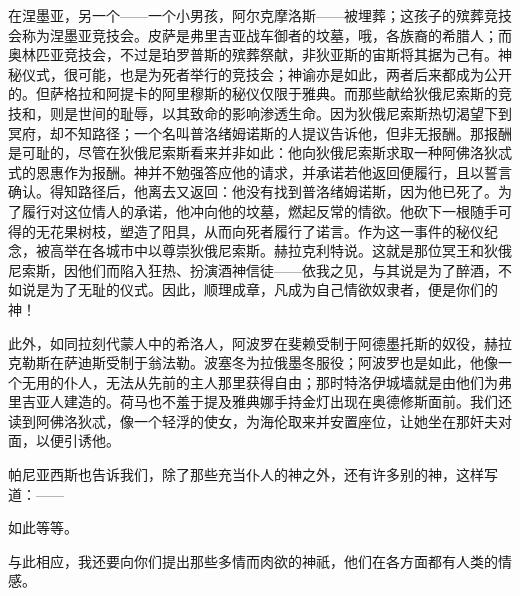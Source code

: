 在涅墨亚，另一个——一个小男孩，阿尔克摩洛斯——被埋葬；这孩子的殡葬竞技会称为涅墨亚竞技会。皮萨是弗里吉亚战车御者的坟墓，哦，各族裔的希腊人；而奥林匹亚竞技会，不过是珀罗普斯的殡葬祭献，非狄亚斯的宙斯将其据为己有。神秘仪式，很可能，也是为死者举行的竞技会；神谕亦是如此，两者后来都成为公开的。但萨格拉和阿提卡的阿里穆斯的秘仪仅限于雅典。而那些献给狄俄尼索斯的竞技和，则是世间的耻辱，以其致命的影响渗透生命。因为狄俄尼索斯热切渴望下到冥府，却不知路径；一个名叫普洛绪姆诺斯的人提议告诉他，但非无报酬。那报酬是可耻的，尽管在狄俄尼索斯看来并非如此：他向狄俄尼索斯求取一种阿佛洛狄忒式的恩惠作为报酬。神并不勉强答应他的请求，并承诺若他返回便履行，且以誓言确认。得知路径后，他离去又返回：他没有找到普洛绪姆诺斯，因为他已死了。为了履行对这位情人的承诺，他冲向他的坟墓，燃起反常的情欲。他砍下一根随手可得的无花果树枝，塑造了阳具，从而向死者履行了诺言。作为这一事件的秘仪纪念，被高举在各城市中以尊崇狄俄尼索斯。赫拉克利特说。这就是那位冥王和狄俄尼索斯，因他们而陷入狂热、扮演酒神信徒——依我之见，与其说是为了醉酒，不如说是为了无耻的仪式。因此，顺理成章，凡成为自己情欲奴隶者，便是你们的神！\par

此外，如同拉刻代蒙人中的希洛人，阿波罗在斐赖受制于阿德墨托斯的奴役，赫拉克勒斯在萨迪斯受制于翁法勒。波塞冬为拉俄墨冬服役；阿波罗也是如此，他像一个无用的仆人，无法从先前的主人那里获得自由；那时特洛伊城墙就是由他们为弗里吉亚人建造的。荷马也不羞于提及雅典娜手持金灯出现在奥德修斯面前。我们还读到阿佛洛狄忒，像一个轻浮的使女，为海伦取来并安置座位，让她坐在那奸夫对面，以便引诱他。\par

帕尼亚西斯也告诉我们，除了那些充当仆人的神之外，还有许多别的神，这样写道：——\par

\par

如此等等。\par

与此相应，我还要向你们提出那些多情而肉欲的神祇，他们在各方面都有人类的情感。\par

\par


